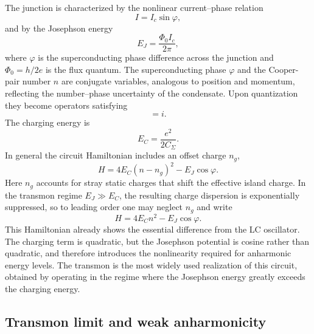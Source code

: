 The junction is characterized by the nonlinear current--phase relation
\begin{equation}
    I = I_c \sin \varphi,
\end{equation}
and by the Josephson energy
\begin{equation}
    E_J = \frac{\Phi_0 I_c}{2\pi},
\end{equation}
where $\varphi$ is the superconducting phase difference across the junction and $\Phi_0 = h/2e$ is the flux quantum. The superconducting phase $\varphi$ and the Cooper-pair number $n$ are conjugate variables, analogous to position and momentum, reflecting the number--phase uncertainty of the condensate. Upon quantization they become operators satisfying
\begin{equation}
    [\varphi,n] = i.
\end{equation}
The charging energy is
\begin{equation}
    E_C = \frac{e^2}{2C_\Sigma}.
\end{equation}
In general the circuit Hamiltonian includes an offset charge $n_g$,
\begin{equation}
    H
    =
    4E_C (n - n_g)^2
    -
    E_J \cos \varphi.
\end{equation}
Here $n_g$ accounts for stray static charges that shift the effective island charge. In the transmon regime $E_J \gg E_C$, the resulting charge dispersion is exponentially suppressed, so to leading order one may neglect $n_g$ and write
\begin{equation}
    H
    =
    4E_C n^2
    -
    E_J \cos \varphi.
    \label{eq:JJ_hamiltonian}
\end{equation}
This Hamiltonian already shows the essential difference from the LC oscillator. The charging term is quadratic, but the Josephson potential is cosine rather than quadratic, and therefore introduces the nonlinearity required for anharmonic energy levels. The transmon is the most widely used realization of this circuit, obtained by operating in the regime where the Josephson energy greatly exceeds the charging energy.

\subsection{Transmon limit and weak anharmonicity}

